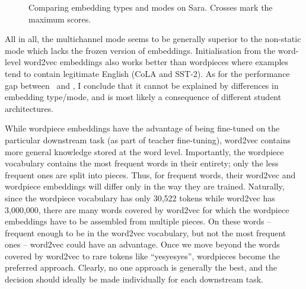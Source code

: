 {{    \begin{figure}[h!t]
      \centering
      \caption{Comparing embedding types and modes on Sara. Crosses mark the maximum scores. \sliding}
      \label{fig:exploration-embed-sara}
    \end{figure}

    All in all, the multichannel mode seems to be generally superior to the non-static mode which lacks the frozen version of embeddings. Initialisation from the word-level word2vec embeddings also works better than wordpieces where examples tend to contain legitimate English (CoLA and SST-2). As for the performance gap between \LSTMS~and \BERTS, I conclude that it cannot be explained by differences in embedding type/mode, and is most likely a consequence of different student architectures.

    While wordpiece embeddings have the advantage of being fine-tuned on the particular downstream task (as part of teacher fine-tuning), word2vec contains more general knowledge stored at the word level.
    Importantly, the wordpiece vocabulary contains the most frequent words in their entirety; only the less frequent ones are split into pieces.
    Thus, for frequent words, their word2vec and wordpiece embeddings will differ only in the way they are trained.
    Naturally, since the wordpiece vocabulary has only 30,522 tokens while word2vec has 3,000,000, there are many words covered by word2vec for which the wordpiece embeddings have to be assembled from multiple pieces. On these words -- frequent enough to be in the word2vec vocabulary, but not the most frequent ones -- word2vec could have an advantage.
    Once we move beyond the words covered by word2vec to rare tokens like ``yesyesyes'', wordpieces become the preferred approach.
    Clearly, no one approach is generally the best, and the decision should ideally be made individually for each downstream task.
  }

}
